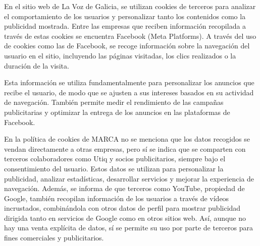En el sitio web de La Voz de Galicia, se utilizan cookies de terceros para analizar el comportamiento de los usuarios y personalizar tanto los contenidos como la publicidad mostrada. Entre las empresas que reciben información recopilada a través de estas cookies se encuentra Facebook (Meta Platforms). A través del uso de cookies como las de Facebook, se recoge información sobre la navegación del usuario en el sitio, incluyendo las páginas visitadas, los clics realizados o la duración de la visita. 

Esta información se utiliza fundamentalmente para personalizar los anuncios que recibe el usuario, de modo que se ajusten a sus intereses basados en su actividad de navegación. También permite medir el rendimiento de las campañas publicitarias y optimizar la entrega de los anuncios en las plataformas de Facebook. 


En la política de cookies de MARCA no se menciona que los datos recogidos se vendan directamente a otras empresas, pero sí se indica que se comparten con terceros colaboradores como Utiq y socios publicitarios, siempre bajo el consentimiento del usuario. Estos datos se utilizan para personalizar la publicidad, analizar estadísticas, desarrollar servicios y mejorar la experiencia de navegación. Además, se informa de que terceros como YouTube, propiedad de Google, también recopilan información de los usuarios a través de vídeos incrustados, combinándola con otros datos de perfil para mostrar publicidad dirigida tanto en servicios de Google como en otros sitios web. Así, aunque no hay una venta explícita de datos, sí se permite su uso por parte de terceros para fines comerciales y publicitarios.
